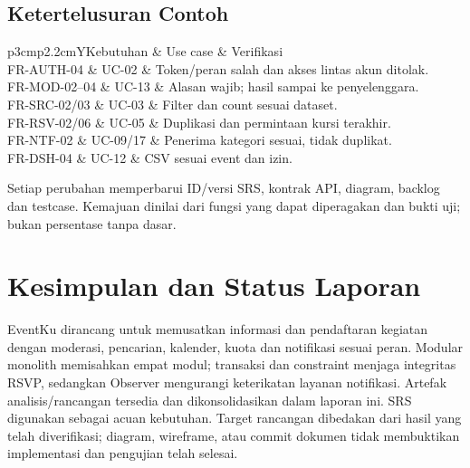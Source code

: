 \documentclass[11pt,a4paper]{article}
\newcommand{\tbl}[2]{\par\smallskip\noindent\begin{tabularx}{\linewidth}{#1}\toprule #2\bottomrule\end{tabularx}\par\smallskip}
\newcommand{\page}[1]{\clearpage\section{#1}}
\begin{document}
\subsection{Ketertelusuran Contoh}
\tbl{p{3cm}p{2.2cm}Y}{Kebutuhan & Use case & Verifikasi\\\midrule
FR-AUTH-04 & UC-02 & Token/peran salah dan akses lintas akun ditolak.\\
FR-MOD-02--04 & UC-13 & Alasan wajib; hasil sampai ke penyelenggara.\\
FR-SRC-02/03 & UC-03 & Filter dan count sesuai dataset.\\
FR-RSV-02/06 & UC-05 & Duplikasi dan permintaan kursi terakhir.\\
FR-NTF-02 & UC-09/17 & Penerima kategori sesuai, tidak duplikat.\\
FR-DSH-04 & UC-12 & CSV sesuai event dan izin.\\}
Setiap perubahan memperbarui ID/versi SRS, kontrak API, diagram, backlog dan testcase. Kemajuan dinilai dari fungsi yang dapat diperagakan dan bukti uji; bukan persentase tanpa dasar.
\page{Kesimpulan dan Status Laporan}
EventKu dirancang untuk memusatkan informasi dan pendaftaran kegiatan dengan moderasi, pencarian, kalender, kuota dan notifikasi sesuai peran. Modular monolith memisahkan empat modul; transaksi dan constraint menjaga integritas RSVP, sedangkan Observer mengurangi keterikatan layanan notifikasi.
Artefak analisis/rancangan tersedia dan dikonsolidasikan dalam laporan ini. SRS digunakan sebagai acuan kebutuhan. Target rancangan dibedakan dari hasil yang telah diverifikasi; diagram, wireframe, atau commit dokumen tidak membuktikan implementasi dan pengujian telah selesai.
\end{document}
